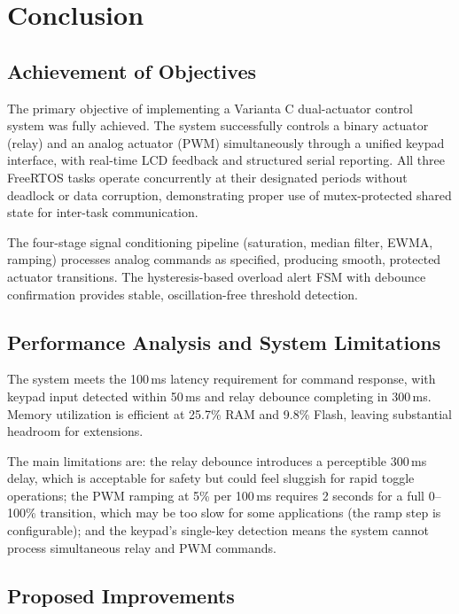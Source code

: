 \section{Conclusion}

\subsection{Achievement of Objectives}

The primary objective of implementing a Varianta C dual-actuator control system was fully achieved. The system successfully controls a binary actuator (relay) and an analog actuator (PWM) simultaneously through a unified keypad interface, with real-time LCD feedback and structured serial reporting. All three FreeRTOS tasks operate concurrently at their designated periods without deadlock or data corruption, demonstrating proper use of mutex-protected shared state for inter-task communication.

The four-stage signal conditioning pipeline (saturation, median filter, EWMA, ramping) processes analog commands as specified, producing smooth, protected actuator transitions. The hysteresis-based overload alert FSM with debounce confirmation provides stable, oscillation-free threshold detection.

\subsection{Performance Analysis and System Limitations}

The system meets the 100\,ms latency requirement for command response, with keypad input detected within 50\,ms and relay debounce completing in 300\,ms. Memory utilization is efficient at 25.7\% RAM and 9.8\% Flash, leaving substantial headroom for extensions.

The main limitations are: the relay debounce introduces a perceptible 300\,ms delay, which is acceptable for safety but could feel sluggish for rapid toggle operations; the PWM ramping at 5\% per 100\,ms requires 2 seconds for a full 0--100\% transition, which may be too slow for some applications (the ramp step is configurable); and the keypad's single-key detection means the system cannot process simultaneous relay and PWM commands.

\subsection{Proposed Improvements}


